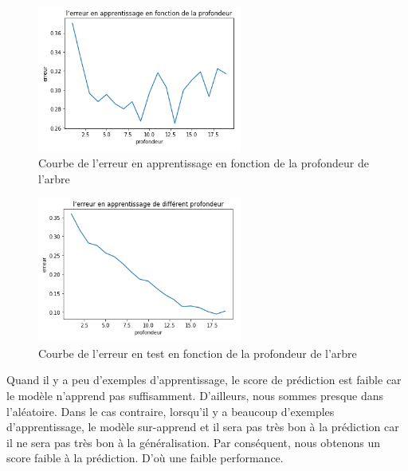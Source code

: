 \documentclass{article}
\begin{document}
\begin{figure}[H]
  \begin{center}
    \includegraphics[width=0.6\textwidth]{erreur_app.png}
    \caption{Courbe de l’erreur en apprentissage en fonction de la profondeur de l'arbre}
  \end{center}
\end{figure}

\begin{figure}[H]
	\begin{center}
		\includegraphics[width=0.6\textwidth]{erreur_test.png}
		\caption{Courbe de l’erreur en test en fonction de la profondeur de l'arbre}
	\end{center}
\end{figure}


Quand il y a peu d'exemples d'apprentissage, le score de prédiction est faible car le modèle n'apprend pas suffisamment. D'ailleurs, nous sommes presque dans l'aléatoire. Dans le cas contraire, lorsqu'il y a beaucoup d'exemples d'apprentissage, le modèle sur-apprend et il sera pas très bon à la prédiction car il ne sera pas très bon à la généralisation. Par conséquent, nous obtenons un score faible à la prédiction. D'où une faible performance.
\end{document}
